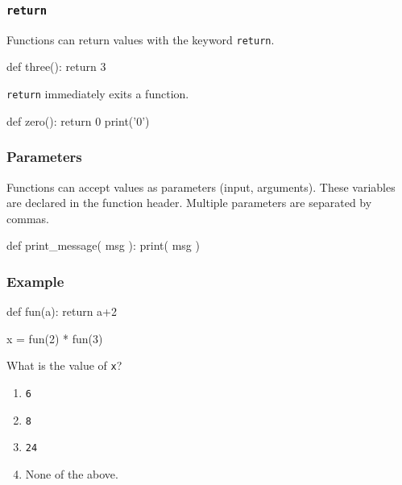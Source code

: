 \documentclass[11pt]{beamer}
\begin{document}
\begin{frame}[fragile]
  \frametitle{\texttt{return}}
  \Enlarge

  \begin{itemize}
  \myitem  Functions can return values with the keyword \texttt{return}.
    \begin{semiverbatim}
def three():
    return 3
    \end{semiverbatim}
  \myitem  \texttt{return} immediately exits a function.
    \begin{semiverbatim}
def zero():
  return 0
  print('0')
    \end{semiverbatim}
  \end{itemize}
\end{frame}

\begin{frame}[fragile]
  \frametitle{Parameters}
  \Enlarge

  \begin{itemize}
  \myitem  Functions can accept values as parameters (input, arguments).
  \myitem  These variables are declared in the function header.
  \myitem  Multiple parameters are separated by commas.
  \end{itemize}
  \begin{semiverbatim}
def print_message( msg ):
    print( msg )
  \end{semiverbatim}
\end{frame}

\begin{frame}[fragile]
  \frametitle{Example}
  \Enlarge

  \begin{semiverbatim}
def fun(a):
    return a+2

x = fun(2) * fun(3)
  \end{semiverbatim}
  What is the value of \texttt{x}?
  \begin{enumerate}[label=\Alph*]
  \item  \texttt{6}
  \item  \texttt{8}
  \item  \texttt{24}
  \item  None of the above.
  \end{enumerate}
\end{frame}
\end{document}
